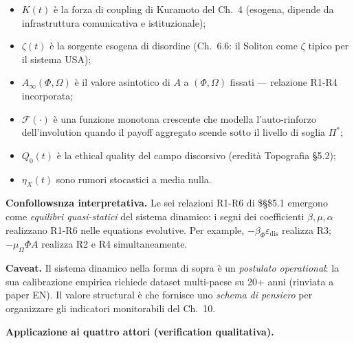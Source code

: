 \begin{itemize}
\tightlist
\item
  \(K(t)\) è la forza di coupling di Kuramoto del Ch.~4 (esogena,
  dipende da infrastruttura comunicativa e istituzionale);
\item
  \(\zeta(t)\) è la sorgente esogena di disordine (Ch.~6.6: il Soliton
  come \(\zeta\) tipico per il sistema USA);
\item
  \(A_\infty(\Phi, \Omega)\) è il valore asintotico di \(A\) a
  \((\Phi, \Omega)\) fissati --- relazione R1-R4 incorporata;
\item
  \(\mathcal{F}(\cdot)\) è una funzione monotona crescente che modella
  l'auto-rinforzo dell'involution quando il payoff aggregato scende
  sotto il livello di soglia \(\Pi^*\);
\item
  \(Q_0(t)\) è la ethical quality del campo discorsivo (eredità Topografia
  \S{}5.2);
\item
  \(\eta_X(t)\) sono rumori stocastici a media nulla.
\end{itemize}

\Proved{} \textbf{Confollowsnza interpretativa.} Le sei relazioni R1-R6 di
\$\S\$5.1 emergono come \emph{equilibri quasi-statici} del sistema
dinamico: i segni dei coefficienti \(\beta, \mu, \alpha\) realizzano
R1-R6 nelle equations evolutive. Per example,
\(-\beta_\Phi \varepsilon_{\text{dis}}\) realizza R3;
\(-\mu_\Omega \Phi A\) realizza R2 e R4 simultaneamente.

\Conj{} \textbf{Caveat.} Il sistema dinamico nella forma di sopra è un
\emph{postulato operational}: la sua calibrazione empirica richiede
dataset multi-paese su 20+ anni (rinviata a paper EN). Il valore
structural è che fornisce uno \emph{schema di pensiero} per organizzare
gli indicatori monitorabili del Ch.~10.

\Hypoth{} \textbf{Applicazione ai quattro attori (verification
qualitativa).}

